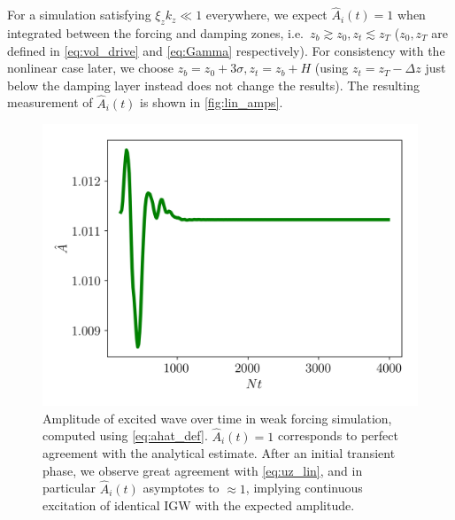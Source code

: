 \documentclass[
        fleqn,
        usenatbib,
    ]{mnras}
\begin{document}
For a simulation satisfying $\xi_z k_z \ll 1$ everywhere, we expect
$\hat{A}_i(t) = 1$ when integrated between the forcing and damping zones, i.e.\
$z_b \gtrsim z_0, z_t \lesssim z_T$ ($z_0, z_T$ are defined in
\autoref{eq:vol_drive} and \autoref{eq:Gamma} respectively). For consistency
with the nonlinear case later, we choose $z_b = z_0 + 3\sigma, z_t = z_b + H$
(using $z_t = z_T - \Delta z$ just below the damping layer instead does not
change the results). The resulting measurement of $\hat{A}_i(t)$ is shown in
\autoref{fig:lin_amps}.
\begin{figure}
    \centering
    \includegraphics[width=\columnwidth]{plots/lin_amps.png}
    \caption{Amplitude of excited wave over time in weak forcing simulation,
    computed using \autoref{eq:ahat_def}. $\hat{A}_i(t) = 1$ corresponds to
    perfect agreement with the analytical estimate. After an initial transient
    phase, we observe great agreement with \autoref{eq:uz_lin}, and in
    particular $\hat{A}_i(t)$ asymptotes to $\approx 1$, implying continuous
    excitation of identical IGW with the expected
    amplitude.}\label{fig:lin_amps}
\end{figure}
\end{document}
